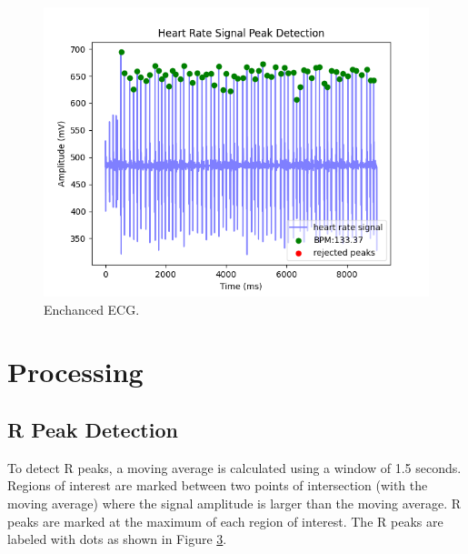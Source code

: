 \documentclass[12pt, a4paper]{article}
\newcommand{\en}{\selectlanguage{english}}
\begin{document}
\begin{figure}[H]
	\centering
	\includegraphics[width=1.0\textwidth, height=0.40\textheight]{Enchanced_ECG.png}
	\caption{\en Enchanced ECG.}
	\label{Enchanced_ECG}
\end{figure}


\section{Processing}

\subsection{R Peak Detection}
To detect R peaks, a moving average is calculated using a window of 1.5 seconds. Regions of interest are marked between two points of intersection (with the moving average) where the signal amplitude is larger than the moving average. R peaks are marked at the maximum of each region of interest. The R peaks are labeled with dots as shown in Figure \hyperref[Enchanced_ECG]{3}.
\end{document}
